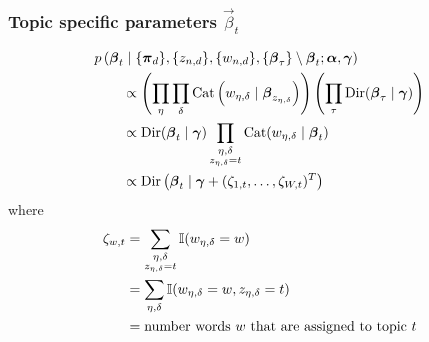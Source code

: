 \subsubsection{Topic specific parameters $\vec \beta_t$}
\begin{align}
    \hspace{2em}&\hspace{-2em}
    p\left(
        \vec \beta_t \given
        \{\vec \pi_d\},
        \{z_{n, d}\},
        \{w_{n, d}\},
        \{\vec \beta_\tau\} \setminus \vec \beta_t;
        \vec \alpha, \vec \gamma
    \right) \nonumber\\
    &\propto 
        \left(
            \prod_\eta \prod_\delta
                \Cat
                \left(
                    w_{\eta, \delta} \given \vec \beta_{z_{\eta, \delta}}
                \right)
        \right)
        \left(
            \prod_\tau
                \Dir(\vec \beta_\tau \given \vec \gamma)
        \right)
        \nonumber\\
    &\propto
        \Dir(\vec \beta_t \given \vec \gamma)
        \prod_{\substack{\eta, \delta \\ z_{\eta, \delta} = t}}
            \Cat(w_{\eta, \delta} \given \vec \beta_t)
        \nonumber \\
    &\propto
        \Dir\left(\vec \beta_t \given \vec \gamma + (\zeta_{1, t}, \dotsc, \zeta_{W, t})^T\right)
\end{align}
where
\begin{align}
    \zeta_{w, t}    &= \sum_{\substack{\eta, \delta \\ z_{\eta, \delta} = t}} \operatorname{\mathbb I}(w_{\eta, \delta} = w) \nonumber\\
                    &= \sum_{\eta, \delta} \operatorname{\mathbb I}(w_{\eta, \delta} = w, z_{\eta, \delta} = t) \label{eqn:models/lda/gibbs/zeta}\\
                    &= \text{number words $w$ that are assigned to topic $t$} \nonumber
\end{align}